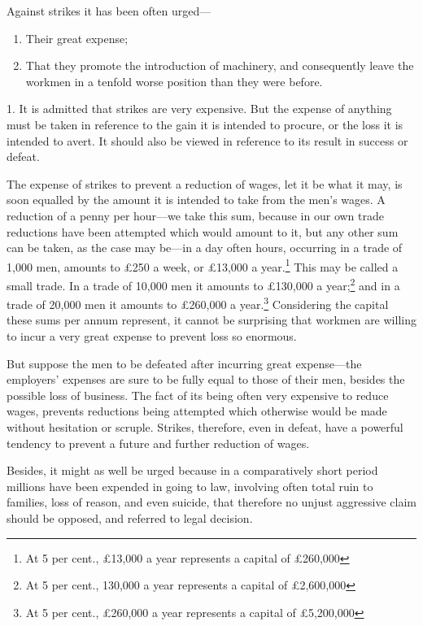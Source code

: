 Against strikes it has been often urged---

\begin{enumerate}
    \item Their great expense;
    \item That they promote the introduction of machinery, and
    consequently leave the workmen in a tenfold worse position than they
    were before.
\end{enumerate}

1. It is admitted that strikes are very expensive. But the expense of
anything must be taken in reference to the gain it is intended to
procure, or the loss it is intended to avert. It should also be viewed
in reference to its result in success or defeat.

The expense of strikes to prevent a reduction of wages, let it be what
it may, is soon equalled by the amount it is intended to take from the
men's wages. A reduction of a penny per hour---we take this sum, because
in our own trade reductions have been attempted which would amount to
it, but any other sum can be taken, as the case may be---in a day often
hours, occurring in a trade of 1,000 men, amounts to £250 a week, or
£13,000 a year.\footnote{At 5 per cent., £13,000 a year represents a
capital of £260,000} This may be called a small trade. In a trade of
10,000 men it amounts to £130,000 a year;\footnote{At 5 per cent.,
130,000 a year represents a capital of £2,600,000} and in a trade of
20,000 men it amounts to £260,000 a year.\footnote{At 5 per cent.,
£260,000 a year represents a capital of £5,200,000} Considering the
capital these sums per annum represent, it cannot be surprising that
workmen are willing to incur a very great expense to prevent loss so
enormous.

But suppose the men to be defeated after incurring great expense---the
employers' expenses are sure to be fully equal to those of their men,
besides the possible loss of business. The fact of its being often very
expensive to reduce wages, prevents reductions being attempted which
otherwise would be made without hesitation or scruple. Strikes,
therefore, even in defeat, have a powerful tendency to prevent a future
and further reduction of wages.

Besides, it might as well be urged because in a comparatively short
period millions have been expended in going to law, involving often
total ruin to families, loss of reason, and even suicide, that therefore
no unjust aggressive claim should be opposed, and referred to legal
decision.

